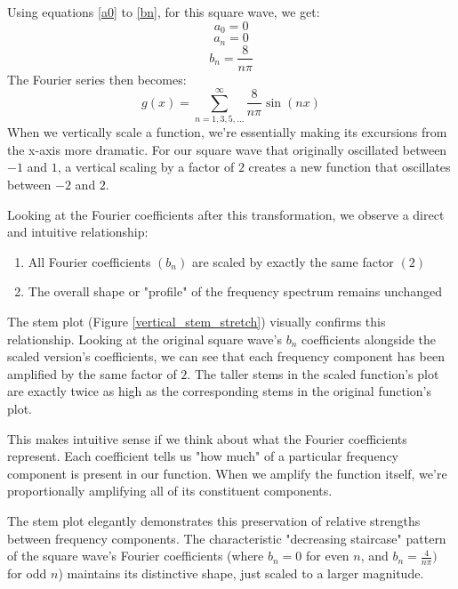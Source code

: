 \documentclass{article}
\begin{document}
Using equations \ref{a0} to \ref{bn}, for this square wave, we get:
    \begin{equation}
    a_0 = 0
    \end{equation}
    \begin{equation}
    a_n = 0
    \end{equation}
    \begin{equation}
    b_n = \frac{8}{n\pi}
    \end{equation}
The Fourier series then becomes:
    \begin{equation}
g(x) = \sum_{n=1,3,5,...}^{\infty} \frac{8}{n\pi} \sin\left(nx\right)
    \end{equation}
When we vertically scale a function, we're essentially making its excursions from the x-axis more dramatic. For our square wave that originally oscillated between $-1$ and $1$, a vertical scaling by a factor of $2$ creates a new function that oscillates between $-2$ and $2$.

Looking at the Fourier coefficients after this transformation, we observe a direct and intuitive relationship:

\begin{enumerate}
\item All Fourier coefficients $(b_n)$ are scaled by exactly the same factor $(2)$
\item The overall shape or "profile" of the frequency spectrum remains unchanged\\
\end{enumerate}
The stem plot (Figure \ref{vertical_stem_stretch}) visually confirms this relationship. Looking at the original square wave's $b_n$ coefficients alongside the scaled version's coefficients, we can see that each frequency component has been amplified by the same factor of $2$. The taller stems in the scaled function's plot are exactly twice as high as the corresponding stems in the original function's plot.

This makes intuitive sense if we think about what the Fourier coefficients represent. Each coefficient tells us "how much" of a particular frequency component is present in our function. When we amplify the function itself, we're proportionally amplifying all of its constituent components.

The stem plot elegantly demonstrates this preservation of relative strengths between frequency components. The characteristic "decreasing staircase" pattern of the square wave's Fourier coefficients (where $b_n = 0$ for even $n$, and $b_n = \frac{4}{n\pi})$ for odd $n$) maintains its distinctive shape, just scaled to a larger magnitude.
\end{document}
